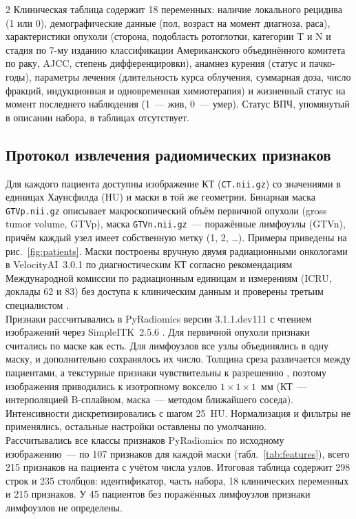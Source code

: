 \documentclass[11pt, a4paper]{article}
\newcommand{\code}[1]{\texttt{\small #1}}
\begin{document}
\begin{multicols}{2}
Клиническая таблица содержит 18 переменных: наличие локального рецидива (1 или 0), демографические данные (пол, возраст на момент диагноза, раса), характеристики опухоли (сторона, подобласть ротоглотки, категории T и N и стадия по 7-му изданию классификации Американского объединённого комитета по раку, AJCC, степень дифференцировки), анамнез курения (статус и пачко-годы), параметры лечения (длительность курса облучения, суммарная доза, число фракций, индукционная и одновременная химиотерапия) и жизненный статус на момент последнего наблюдения (1~--- жив, 0~--- умер). Статус ВПЧ, упомянутый в описании набора, в таблицах отсутствует.

\subsection*{Протокол извлечения радиомических признаков}

Для каждого пациента доступны изображение КТ (\code{CT.nii.gz}) со значениями в единицах Хаунсфилда (HU) и маски в той же геометрии. Бинарная маска \code{GTVp.nii.gz} описывает макроскопический объём первичной опухоли (gross tumor volume, GTVp), маска \code{GTVn.nii.gz}~--- поражённые лимфоузлы (GTVn), причём каждый узел имеет собственную метку (1, 2, \dots). Примеры приведены на рис.~\ref{fig:patients}. Маски построены вручную двумя радиационными онкологами в VelocityAI~3.0.1 по диагностическим КТ согласно рекомендациям Международной комиссии по радиационным единицам и измерениям (ICRU, доклады 62 и 83) без доступа к клиническим данным и проверены третьим специалистом \cite{Elhalawani2017}.\vspace{6pt}\\
Признаки рассчитывались в PyRadiomics версии 3.1.1.dev111 \cite{vanGriethuysen2017} с чтением изображений через SimpleITK~2.5.6 \cite{Lowekamp2013}. Для первичной опухоли признаки считались по маске как есть. Для лимфоузлов все узлы объединялись в одну маску, и дополнительно сохранялось их число. Толщина среза различается между пациентами, а текстурные признаки чувствительны к разрешению \cite{Zwanenburg2020}, поэтому изображения приводились к изотропному вокселю $1\times1\times1$~мм (КТ~--- интерполяцией B-сплайном, маска~--- методом ближайшего соседа). Интенсивности дискретизировались с шагом 25~HU. Нормализация и фильтры не применялись, остальные настройки оставлены по умолчанию.\vspace{6pt}\\
Рассчитывались все классы признаков PyRadiomics по исходному изображению~--- по 107 признаков для каждой маски (табл.~\ref{tab:features}), всего 215 признаков на пациента с учётом числа узлов. Итоговая таблица содержит 298 строк и 235 столбцов: идентификатор, часть набора, 18 клинических переменных и 215 признаков. У 45 пациентов без поражённых лимфоузлов признаки лимфоузлов не определены.






\end{multicols}
\end{document}
